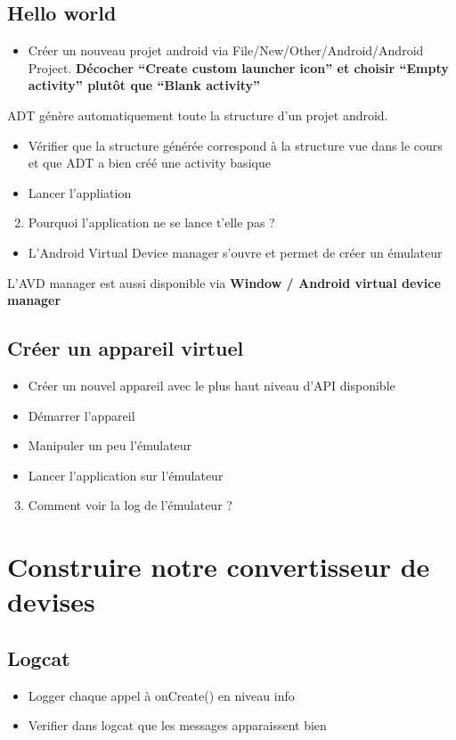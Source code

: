 \documentclass{article}
\begin{document}
\subsection{Hello world}
\begin{itemize}
\item Créer un nouveau projet android via File/New/Other/Android/Android
Project. \textbf{Décocher ``Create custom launcher icon'' et choisir ``Empty
activity'' plutôt que ``Blank activity''}
\end{itemize}
ADT génère automatiquement toute la structure d'un projet android.
\begin{itemize}
\item Vérifier que la structure générée correspond à la structure vue dans le
cours et que ADT a bien créé une activity basique
\item Lancer l'appliation
\end{itemize}
\begin{enumerate}
 \setcounter{enumi}{1}
\item Pourquoi l'application ne se lance t'elle pas ?
\end{enumerate}
\begin{itemize}
\item L'Android Virtual Device manager s'ouvre et permet de créer un
émulateur
\end{itemize}
L'AVD manager est aussi disponible via \textbf{Window / Android virtual
device manager}
\subsection{Créer un appareil virtuel}
\begin{itemize}
\item Créer un nouvel appareil avec le plus haut niveau d'API disponible
\item Démarrer l'appareil
\item Manipuler un peu l'émulateur
\item Lancer l'application sur l'émulateur
\end{itemize}
\begin{enumerate}
 \setcounter{enumi}{2}
\item Comment voir la log de l'émulateur ?
\end{enumerate}
\section{Construire notre convertisseur de devises}
\subsection{Logcat}
\begin{itemize}
\item Logger chaque appel à onCreate() en niveau info
\item Verifier dans logcat que les messages apparaissent bien
\end{itemize}
\end{document}
